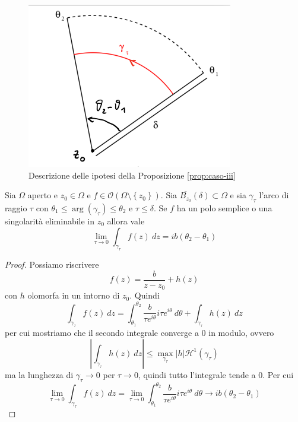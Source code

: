 \begin{proposition}
  
  \begin{figure}[h]
    \centering
    \includegraphics[width=0.4\linewidth]{images/analisi_complessa/residui_figura_3.png}
    \caption{Descrizione delle ipotesi della Proposizione \ref{prop:caso-iii}}
  \end{figure}

  Sia $\Omega$ aperto e $z_0 \in \Omega$ e $f \in
  \mathcal{O}(\Omega\setminus\left\{ z_0 \right\})$. Sia
  $\overline{B_{z_0}}(\delta) \subset \Omega$ e sia $\gamma_\tau$ l'arco di
  raggio $\tau$ con $\theta_1 \le \operatorname{arg}(\gamma_\tau) \le \theta_2$
  e $\tau \le \delta$. Se $f$ ha un polo semplice o una singolarità eliminabile
  in $z_0$ allora vale
  \begin{equation*}
    \lim_{\tau \to 0} \int_{\gamma_{\tau}} f(z) \ dz = ib(\theta_2-\theta_1)
  \end{equation*}
  \label{prop:caso-iii}
\end{proposition}
\begin{proof}
  Possiamo riscrivere 
  \begin{equation*}
    f(z) = \frac{b}{z-z_0} + h(z)
  \end{equation*}
  con $h$ olomorfa in un intorno di $z_0$. Quindi
  \begin{equation*}
    \int_{\gamma_\tau} f(z)\ dz = \int_{\theta_1}^{\theta_2}
    \frac{b}{\tau e^{i\theta}} i \tau e^{i\theta} \ d\theta + \int_{\gamma_\tau}
    h(z)\ dz
  \end{equation*}
  per cui mostriamo che il secondo integrale converge a $0$ in modulo, ovvero
  \begin{equation*}
    \left| \int_{\gamma_\tau} h(z)\ dz \right| \le \max_{\gamma_\tau} |h|
    \mathcal{H}^1(\gamma_\tau) 
  \end{equation*}
  ma la lunghezza di $\gamma_\tau\to 0$ per $\tau \to 0$, quindi tutto
  l'integrale tende a $0$.
  Per cui
  \begin{equation*}
    \lim_{\tau\to 0} \int_{\gamma_\tau} f(z)\ dz = \lim_{\tau \to 0} 
    \int_{\theta_1}^{\theta_2} \frac{b}{\tau e^{i\theta}} i \tau e^{i\theta}
    \ d\theta \to ib(\theta_2 - \theta_1) 
  \end{equation*}
\end{proof}

